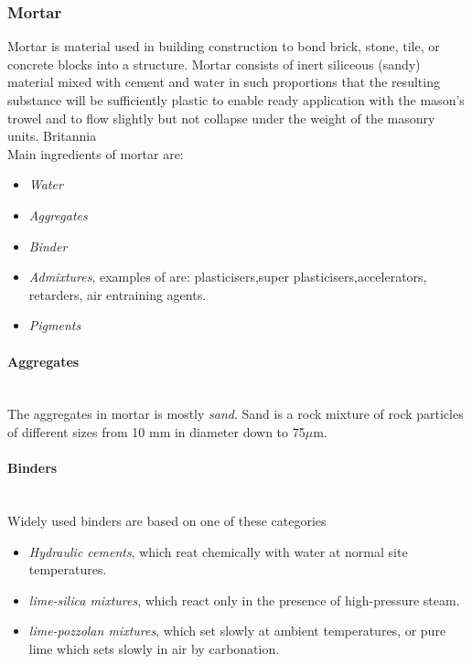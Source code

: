 \subsubsection{Mortar}

Mortar is  material used in building construction to bond brick, stone, tile, or concrete blocks into a structure. Mortar consists of inert siliceous (sandy) material mixed with cement and water in such proportions that the resulting substance will be sufficiently plastic to enable ready application with the mason’s trowel and to flow slightly but not collapse under the weight of the masonry units. Britannia \\

Main ingredients of mortar are:
\begin{itemize}
\item \textit{Water}
\item \textit{Aggregates}
\item \textit{Binder}
\item \textit{Admixtures}, examples of are: plasticisers,super plasticisers,accelerators, retarders, air entraining agents. 
\item \textit{Pigments}


\end{itemize}

\paragraph{Aggregates}~\\
The aggregates in mortar is mostly \textit{sand}. Sand is a rock mixture of rock particles of different sizes from 10 mm in diameter down to 75$\mu$m. 


\paragraph{Binders}~\\  Widely used binders are based on one of these categories
\begin{itemize}
\item \textit{Hydraulic cements}, which reat chemically with water at normal site temperatures.
\item \textit{lime-silica mixtures}, which react only in the presence of high-pressure steam.
\item \textit{lime-pozzolan mixtures}, which set slowly at ambient temperatures, or pure lime which sets slowly in air by carbonation.  
\end{itemize}
